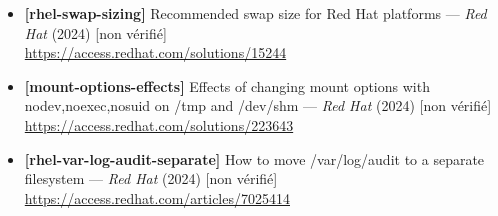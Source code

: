 \documentclass[10pt,a4paper]{article}
\begin{document}
\begin{itemize}[leftmargin=1.6em]
\item \textbf{[rhel-swap-sizing]} Recommended swap size for Red Hat platforms --- \textit{Red Hat} (2024) \textcolor{cMed}{[non v\'erifi\'e]}\\ \url{https://access.redhat.com/solutions/15244}
\item \textbf{[mount-options-effects]} Effects of changing mount options with nodev,noexec,nosuid on /tmp and /dev/shm --- \textit{Red Hat} (2024) \textcolor{cMed}{[non v\'erifi\'e]}\\ \url{https://access.redhat.com/solutions/223643}
\item \textbf{[rhel-var-log-audit-separate]} How to move /var/log/audit to a separate filesystem --- \textit{Red Hat} (2024) \textcolor{cMed}{[non v\'erifi\'e]}\\ \url{https://access.redhat.com/articles/7025414}
\end{itemize}
\end{document}
